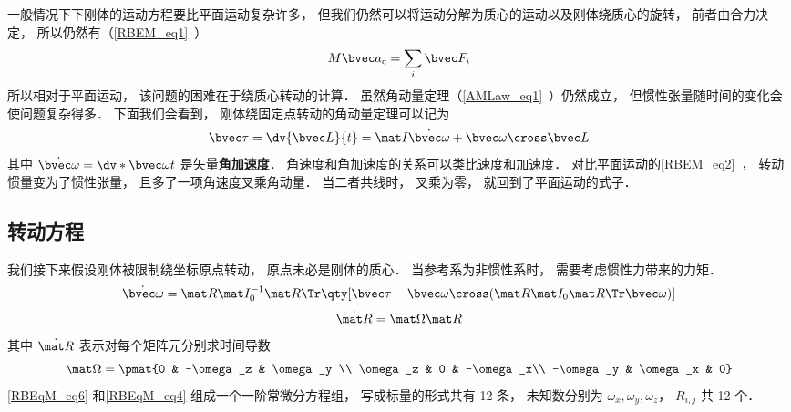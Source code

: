 

一般情况下下刚体的运动方程要比平面运动复杂许多， 但我们仍然可以将运动分解为质心的运动以及刚体绕质心的旋转， 前者由合力决定， 所以仍然有（\autoref{RBEM_eq1}~）
\begin{equation}\label{RBEqM_eq8}
M\bvec a_c = \sum_i \bvec F_i
\end{equation}
所以相对于平面运动， 该问题的困难在于绕质心转动的计算． 虽然角动量定理（\autoref{AMLaw_eq1}~）仍然成立， 但惯性张量随时间的变化会使问题复杂得多． 下面我们会看到， 刚体绕固定点转动的角动量定理可以记为
\begin{equation}\label{RBEqM_eq1}
\bvec\tau = \dv{\bvec L}{t} = \mat I \dot{\bvec\omega} + \bvec\omega \cross \bvec L
\end{equation}
其中 $\dot{\bvec\omega} = \dv*{\bvec\omega}{t}$ 是矢量\textbf{角加速度}． 角速度和角加速度的关系可以类比速度和加速度． 对比平面运动的\autoref{RBEM_eq2}~， 转动惯量变为了惯性张量， 且多了一项角速度叉乘角动量． 当二者共线时， 叉乘为零， 就回到了平面运动的式子．

\subsection{转动方程}
我们接下来假设刚体被限制绕坐标原点转动， 原点未必是刚体的质心． 当参考系为非惯性系时， 需要考虑惯性力带来的力矩． 
\begin{equation}\label{RBEqM_eq6}
\dot{\bvec \omega} = \mat R \mat I_0^{-1} \mat R\Tr \qty[\bvec \tau  - \bvec\omega\cross(\mat R \mat I_0 \mat R\Tr \bvec\omega)]
\end{equation}
\begin{equation}\label{RBEqM_eq4}
\dot{\mat R} = \mat\Omega \mat R
\end{equation}
其中 $\dot{\mat R}$ 表示对每个矩阵元分别求时间导数
\begin{equation}\label{RBEqM_eq5}
\mat\Omega = \pmat{0 & -\omega_z & \omega_y \\ \omega_z & 0 & -\omega_x\\ -\omega_y & \omega_x & 0}
\end{equation}
\autoref{RBEqM_eq6} 和\autoref{RBEqM_eq4} 组成一个一阶常微分方程组， 写成标量的形式共有 12 条， 未知数分别为 $\omega_x, \omega_y, \omega_z$， $R_{i,j}$ 共 12 个．

